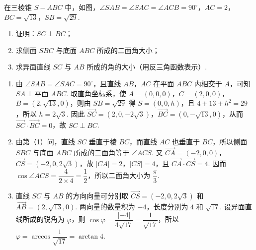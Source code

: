 \begin{problem}
在三棱锥 \(S-ABC\) 中，如图，\(\angle SAB=\angle SAC=\angle ACB=90^{\circ}\)，\(AC=2\)，\(BC=\sqrt{13}\)，\(SB=\sqrt{29}\).
\begin{enumerate}
\item 证明：\(SC\perp BC\)；
\item 求侧面 \(SBC\) 与底面 \(ABC\) 所成的二面角大小；
\item 求异面直线 \(SC\) 与 \(AB\) 所成的角的大小（用反三角函数表示）.
\end{enumerate}

\begin{solution}
\begin{enumerate}
\item 由 \(\angle SAB=\angle SAC=90^{\circ}\)，且直线 \(AB\)，\(AC\) 在平面 \(ABC\) 内相交于 \(A\)，可知 \(SA\perp\text{平面 }ABC\). 取直角坐标系，使 \(A=(0,0,0)\)，\(C=(2,0,0)\)，\(B=(2,\sqrt{13},0)\)，则由 \(SB=\sqrt{29}\) 得 \(S=(0,0,h)\)，且 \(4+13+h^{2}=29\)，所以 \(h=2\sqrt{3}\). 因此 \(\overrightarrow{SC}=(2,0,-2\sqrt{3})\)，\(\overrightarrow{BC}=(0,-\sqrt{13},0)\)，从而 \(\overrightarrow{SC}\cdot\overrightarrow{BC}=0\)，故 \(SC\perp BC\).
\item 由第（1）问，直线 \(SC\) 垂直于棱 \(BC\)，而直线 \(AC\) 也垂直于 \(BC\)，所以侧面 \(SBC\) 与底面 \(ABC\) 所成的二面角等于 \(\angle ACS\). 又 \(\overrightarrow{CA}=(-2,0,0)\)，\(\overrightarrow{CS}=(-2,0,2\sqrt{3})\)，故 \(\lvert CA\rvert=2\)，\(\lvert CS\rvert=4\)，且 \(\overrightarrow{CA}\cdot\overrightarrow{CS}=4\). 因而 \(\cos\angle ACS=\dfrac{4}{2\times4}=\dfrac12\)，所以二面角大小为 \(\dfrac{\pi}{3}\).
\item 直线 \(SC\) 与 \(AB\) 的方向向量可分别取 \(\overrightarrow{CS}=(-2,0,2\sqrt{3})\) 和 \(\overrightarrow{AB}=(2,\sqrt{13},0)\). 两向量的数量积为 \(-4\)，长度分别为 \(4\) 和 \(\sqrt{17}\). 设异面直线所成的锐角为 \(\varphi\)，则 \(\cos\varphi=\dfrac{\lvert-4\rvert}{4\sqrt{17}}=\dfrac{1}{\sqrt{17}}\)，所以 \(\varphi=\arccos\dfrac{1}{\sqrt{17}}=\arctan4\).
\end{enumerate}
\end{solution}
\end{problem}

